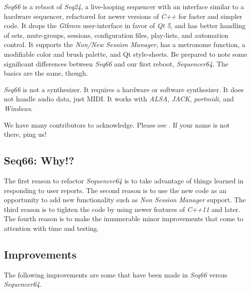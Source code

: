 \documentclass[
 11pt,
 twoside,
 a4paper,
 final                                 %
]{article}
\begin{document}
   \textsl{Seq66} is
   a reboot of \textsl{Seq24},
   a live-looping sequencer with an interface similar to a hardware sequencer,
   refactored for newer versions of
   \textsl{C++} for faster and simpler code.
   It drops the
   \textsl{Gtkmm} user-interface in favor of \textsl{Qt 5},
   and has better handling of sets, mute-groups, sessions, configuration files,
   play-lists, and automation control.
   It supports the \textsl{Non/New Session Manager},
   has a metronome function,
   a modifiable color and brush palette,
   and Qt style-sheets.
   Be prepared to note some significant differences
   between \textsl{Seq66} and our first reboot, \textsl{Sequencer64}.
   The basics are the same, though.

   \textsl{Seq66} is not a synthesizer.
   It requires a hardware or software synthesizer.
   It does not handle audio data, just MIDI.
   It works with \textsl{ALSA}, \textsl{JACK},
   \textsl{portmidi}, and \textsl{Windows}.

   We have many contributors to acknowledge.
   Please see .
   If your name is not there, ping us!

\subsection{Seq66: Why!?}
\label{subsec:introduction_vs_others}

   The first reason to refactor \textsl{Sequencer64} is to take advantage of
   things learned in responding to user reports.  The second reason is to use
   the new code as an opportunity to add new functionality such as
   \textsl{Non Session Manager} support.  The third reason is to tighten the
   code by using newer features of \textsl{C++11} and later.
   The fourth reason is to make the innumerable minor improvements that come to
   attention with time and testing.

\subsection{Improvements}
\label{subsec:improvements}

   The following improvements are some that have been made in
   \textsl{Seq66} versus \textsl{Sequencer64}.
\end{document}
